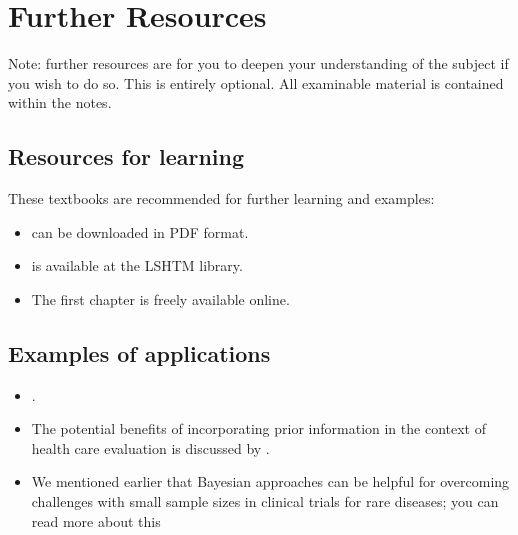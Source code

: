 \documentclass[letterpaper,10pt,english]{jupyterBook}
\begin{document}
\section{Further Resources}
\label{\detokenize{10.g. Bayesian Statistics II:further-resources}}\label{\detokenize{10.g. Bayesian Statistics II::doc}}
\sphinxAtStartPar
Note: further resources are for you to deepen your understanding of the subject if you wish to do so. This is entirely optional. All examinable material is contained within the notes.


\subsection{Resources for learning}
\label{\detokenize{10.g. Bayesian Statistics II:resources-for-learning}}
\sphinxAtStartPar
These textbooks are recommended for further learning and examples:
\begin{itemize}
\item {} 
\sphinxAtStartPar
{} can be downloaded in PDF format.

\item {} 
\sphinxAtStartPar
{} is available at the LSHTM library.

\item {} 
\sphinxAtStartPar
{} The first chapter is freely available online.

\end{itemize}


\subsection{Examples of applications}
\label{\detokenize{10.g. Bayesian Statistics II:examples-of-applications}}\begin{itemize}
\item {} 
\sphinxAtStartPar
{}.

\item {} 
\sphinxAtStartPar
The potential benefits of incorporating prior information in the context of health care evaluation is discussed by .

\item {} 
\sphinxAtStartPar
We mentioned earlier that Bayesian approaches can be helpful for overcoming challenges with small sample sizes in clinical trials for rare diseases; you can read more about this 

\end{itemize}
\end{document}

